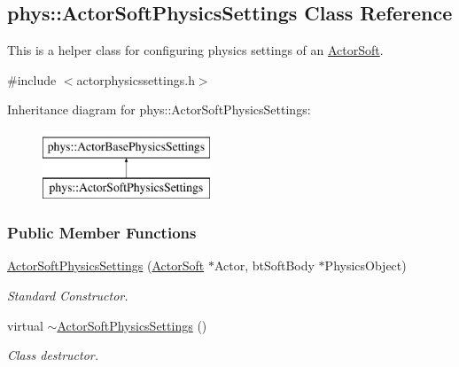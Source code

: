 \hypertarget{classphys_1_1ActorSoftPhysicsSettings}{
\subsection{phys::ActorSoftPhysicsSettings Class Reference}
\label{classphys_1_1ActorSoftPhysicsSettings}
}


This is a helper class for configuring physics settings of an \hyperlink{classphys_1_1ActorSoft}{ActorSoft}.  




{\ttfamily \#include $<$actorphysicssettings.h$>$}

Inheritance diagram for phys::ActorSoftPhysicsSettings:\begin{figure}[H]
\begin{center}
\leavevmode
\includegraphics[height=2.000000cm]{classphys_1_1ActorSoftPhysicsSettings}
\end{center}
\end{figure}
\subsubsection*{Public Member Functions}
\begin{DoxyCompactItemize}
\item 
\hyperlink{classphys_1_1ActorSoftPhysicsSettings_a4b5f0d9f1f4c36b3d429528cfbacf35c}{ActorSoftPhysicsSettings} (\hyperlink{classphys_1_1ActorSoft}{ActorSoft} $\ast$Actor, btSoftBody $\ast$PhysicsObject)
\begin{DoxyCompactList}\small\item\em Standard Constructor. \item\end{DoxyCompactList}\item 
\hypertarget{classphys_1_1ActorSoftPhysicsSettings_a9728c78b1bd9a7c1bc2c35619bc01a4a}{
virtual \hyperlink{classphys_1_1ActorSoftPhysicsSettings_a9728c78b1bd9a7c1bc2c35619bc01a4a}{$\sim$ActorSoftPhysicsSettings} ()}
\label{classphys_1_1ActorSoftPhysicsSettings_a9728c78b1bd9a7c1bc2c35619bc01a4a}

\begin{DoxyCompactList}\small\item\em Class destructor. \item\end{DoxyCompactList}\end{DoxyCompactItemize}
